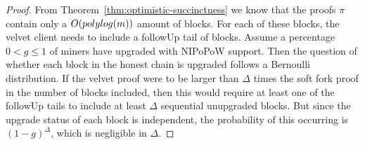 \begin{proof}
    From Theorem~\ref{thm:optimistic-succinctness} we know that the proofs $\pi$ contain
    only a $O(poly\-log(m))$ amount of blocks. For each of these blocks, the
    velvet client needs to include a followUp tail of blocks. Assume a
    percentage $0 < g \leq 1$ of miners have upgraded with NIPoPoW support.
    Then the question of whether each block in the honest chain is upgraded
    follows a Bernoulli distribution. If the velvet proof were to be larger
    than $\Delta$ times the soft fork proof in the number of blocks included,
    then this would require at least one of the followUp tails to include at
    least $\Delta$ sequential unupgraded blocks. But since the upgrade status
    of each block is independent, the probability of this occurring is
    $(1 - g)^\Delta$, which is negligible in $\Delta$.
\end{proof}
